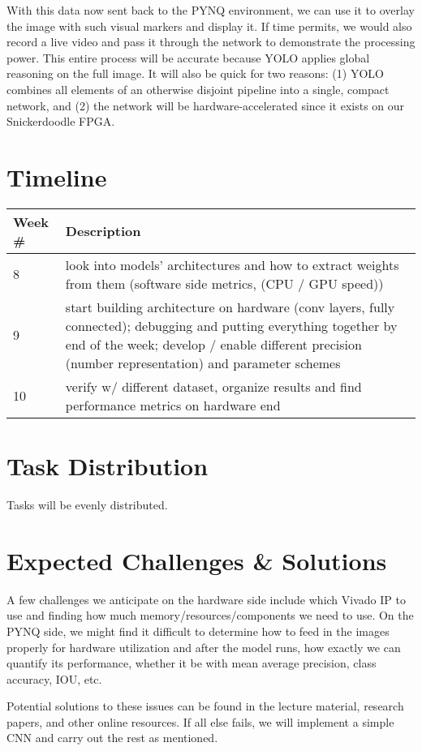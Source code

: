 \documentclass[10pt, twocolumn, letterpaper]{article}
\begin{document}
\vspace{\baselineskip}
\noindent
With this data now sent back to the PYNQ environment, we can use it to overlay the image with such visual markers and display it. If time permits, we would also record a live video and pass it through the network to demonstrate the processing power. This entire process will be accurate because YOLO applies global reasoning on the full image. It will also be quick for two reasons: (1) YOLO combines all elements of an otherwise disjoint pipeline into a single, compact network, and (2) the network will be hardware-accelerated since it exists on our Snickerdoodle FPGA.  

\section{Timeline}
\begin{center}
  \begin{tabular}{ ||p{}|p{} ||}
  \hline
  Week \# & Description \\ [0.5ex]
  \hline\hline
   8 & look into models' architectures and how to extract weights from them  (software side metrics, (CPU / GPU speed))  \\ 
   \hline
   9 & start building architecture on hardware (conv layers, fully connected); debugging and putting everything together by end of the week; develop / enable different precision (number representation) and parameter schemes \\  
   \hline
   10 & verify w/ different dataset, organize results and find performance metrics on hardware end \\
  \hline  
  \end{tabular}
\end{center}

\section{Task Distribution}
Tasks will be evenly distributed.

\section{Expected Challenges \& Solutions}
A few challenges we anticipate on the hardware side include which Vivado IP to use and finding how much memory/resources/components we need to use. On the PYNQ side, we might find it difficult to determine how to feed in the images properly for hardware utilization and after the model runs, how exactly we can quantify its performance, whether it be with mean average precision, class accuracy, IOU, etc. 

\vspace{\baselineskip}
\noindent
Potential solutions to these issues can be found in the lecture material, research papers, and other online resources. If all else fails, we will implement a simple CNN and carry out the rest as mentioned. 
\end{document}
